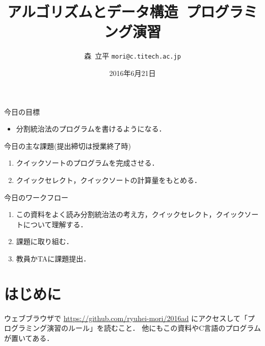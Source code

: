 \documentclass[a4paper,twoside,onecolumn,openany,article]{memoir}
\title{アルゴリズムとデータ構造~プログラミング演習}
\date{2016年6月21日}
\author{森~立平 \texttt{mori@c.titech.ac.jp}}
\theoremstyle{remark}
\begin{document}
\maketitle

\noindent
今日の目標
\begin{itemize}
\item 分割統治法のプログラムを書けるようになる．
\end{itemize}

\noindent
今日の主な課題(提出締切は授業終了時)
\begin{enumerate}
\item クイックソートのプログラムを完成させる．
\item クイックセレクト，クイックソートの計算量をもとめる．
\end{enumerate}

\noindent
今日のワークフロー
\begin{enumerate}
\item この資料をよく読み分割統治法の考え方，クイックセレクト，クイックソートについて理解する．
\item 課題に取り組む．
\item 教員かTAに課題提出．
\end{enumerate}

\section{はじめに}
ウェブブラウザで \url{https://github.com/ryuhei-mori/2016ad} にアクセスして「プログラミング演習のルール」を読むこと．
他にもこの資料やC言語のプログラムが置いてある．
\end{document}
